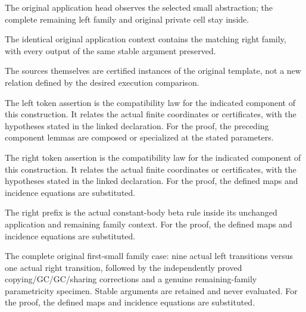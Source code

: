 The original application head observes the selected small abstraction; the complete remaining left family and original private cell stay inside.
\par{}

The identical original application context contains the matching right family, with every output of the same stable argument preserved.
\par{}

The sources themselves are certified instances of the original template, not a new relation defined by the desired execution comparison.
\par{}

The left token assertion is the compatibility law for the indicated component of this construction. It relates the actual finite coordinates or certificates, with the hypotheses stated in the linked declaration.
For the proof, the preceding component lemmas are composed or specialized at the stated parameters.
\par{}

The right token assertion is the compatibility law for the indicated component of this construction. It relates the actual finite coordinates or certificates, with the hypotheses stated in the linked declaration.
For the proof, the defined maps and incidence equations are substituted.
\par{}

The right prefix is the actual constant-body beta rule inside its unchanged application and remaining family context.
For the proof, the defined maps and incidence equations are substituted.
\par{}

The complete original first-small family case: nine actual left transitions versus one actual right transition, followed by the independently proved copying/GC/GC/sharing corrections and a genuine remaining-family parametricity specimen. Stable arguments are retained and never evaluated.
For the proof, the defined maps and incidence equations are substituted.
\par{}

